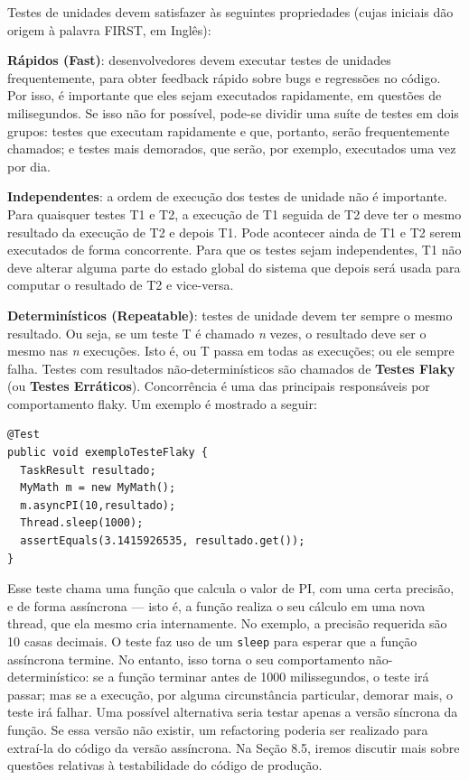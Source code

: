 \documentclass[
  11pt,
  twoside]{book}
\newcommand{\passthrough}[1]{#1}
\begin{document}

Testes de unidades devem satisfazer às seguintes propriedades (cujas
iniciais dão origem à palavra FIRST, em Inglês):

\textbf{Rápidos (Fast)}: desenvolvedores devem executar testes de
unidades frequentemente, para obter feedback rápido sobre bugs e
regressões no código. Por isso, é importante que eles sejam executados
rapidamente, em questões de milisegundos. Se isso não for possível,
pode-se dividir uma suíte de testes em dois grupos: testes que executam
rapidamente e que, portanto, serão frequentemente chamados; e testes
mais demorados, que serão, por exemplo, executados uma vez por dia.

\textbf{Independentes}: a ordem de execução dos testes de unidade não é
importante. Para quaisquer testes T1 e T2, a execução de T1 seguida de
T2 deve ter o mesmo resultado da execução de T2 e depois T1. Pode
acontecer ainda de T1 e T2 serem executados de forma concorrente. Para
que os testes sejam independentes, T1 não deve alterar alguma parte do
estado global do sistema que depois será usada para computar o resultado
de T2 e vice-versa.

 
\textbf{Determinísticos (Repeatable)}: testes de unidade devem ter
sempre o mesmo resultado. Ou seja, se um teste T é chamado \emph{n}
vezes, o resultado deve ser o mesmo nas \emph{n} execuções. Isto é, ou T
passa em todas as execuções; ou ele sempre falha. Testes com resultados
não-determinísticos são chamados de \textbf{Testes Flaky} (ou
\textbf{Testes Erráticos}). Concorrência é uma das principais
responsáveis por comportamento flaky. Um exemplo é mostrado a seguir:

\begin{lstlisting}
@Test
public void exemploTesteFlaky {
  TaskResult resultado;
  MyMath m = new MyMath();
  m.asyncPI(10,resultado);
  Thread.sleep(1000);
  assertEquals(3.1415926535, resultado.get());
}
\end{lstlisting}

Esse teste chama uma função que calcula o valor de PI, com uma certa
precisão, e de forma assíncrona --- isto é, a função realiza o seu
cálculo em uma nova thread, que ela mesmo cria internamente. No exemplo,
a precisão requerida são 10 casas decimais. O teste faz uso de um
\passthrough{\lstinline!sleep!} para esperar que a função assíncrona
termine. No entanto, isso torna o seu comportamento não-determinístico:
se a função terminar antes de 1000 milissegundos, o teste irá passar;
mas se a execução, por alguma circunstância particular, demorar mais, o
teste irá falhar. Uma possível alternativa seria testar apenas a versão
síncrona da função. Se essa versão não existir, um refactoring poderia
ser realizado para extraí-la do código da versão assíncrona. Na Seção
8.5, iremos discutir mais sobre questões relativas à testabilidade do
código de produção.
\end{document}
